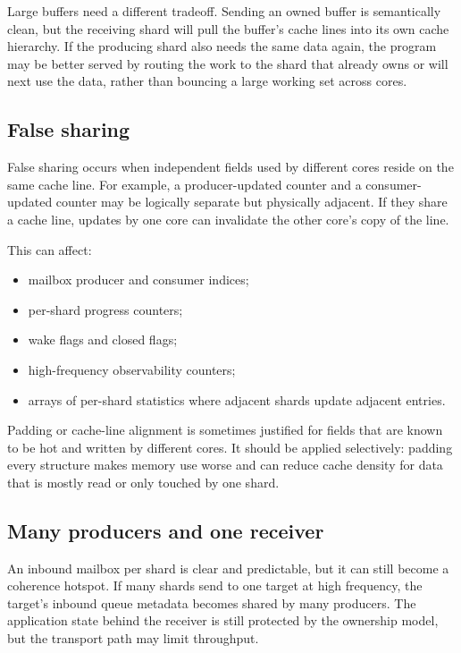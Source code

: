 Large buffers need a different tradeoff. Sending an owned buffer is semantically
clean, but the receiving shard will pull the buffer's cache lines into its own
cache hierarchy. If the producing shard also needs the same data again, the
program may be better served by routing the work to the shard that already owns
or will next use the data, rather than bouncing a large working set across
cores.

\subsection{False sharing}

False sharing occurs when independent fields used by different cores reside on
the same cache line. For example, a producer-updated counter and a
consumer-updated counter may be logically separate but physically adjacent. If
they share a cache line, updates by one core can invalidate the other core's
copy of the line.

This can affect:

\begin{itemize}
    \item mailbox producer and consumer indices;
    \item per-shard progress counters;
    \item wake flags and closed flags;
    \item high-frequency observability counters;
    \item arrays of per-shard statistics where adjacent shards update adjacent
          entries.
\end{itemize}

Padding or cache-line alignment is sometimes justified for fields that are
known to be hot and written by different cores. It should be applied
selectively: padding every structure makes memory use worse and can reduce
cache density for data that is mostly read or only touched by one shard.

\subsection{Many producers and one receiver}

An inbound mailbox per shard is clear and predictable, but it can still become
a coherence hotspot. If many shards send to one target at high frequency, the
target's inbound queue metadata becomes shared by many producers. The
application state behind the receiver is still protected by the ownership
model, but the transport path may limit throughput.

